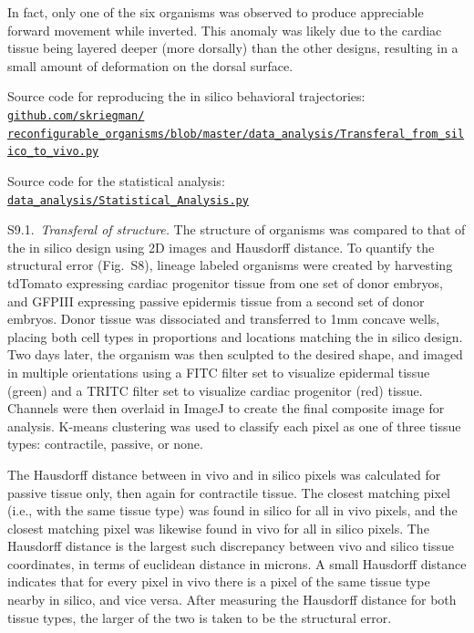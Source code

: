 In fact, only one of the six organisms was observed to produce appreciable forward movement while inverted. 
This anomaly was likely due to the cardiac tissue being layered deeper (more dorsally) than the other designs, resulting in a small amount of deformation on the dorsal surface. 


Source code for reproducing the in silico behavioral trajectories:
\href{https://github.com/skriegman/reconfigurable_organisms/blob/master/data_analysis/Transferal_from_silico_to_vivo.py}{\scriptsize\tt\color{blue}github.com/skriegman/ \\ reconfigurable\_organisms/blob/master/data\_analysis/Transferal\_from\_silico\_to\_vivo.py}

Source code for the statistical analysis:
\href{https://github.com/skriegman/reconfigurable_organisms/blob/master/data_analysis/Statistical_Analysis.py}{\scriptsize\tt\color{blue}data\_analysis/Statistical\_Analysis.py}

\vspace{1em}

S9.1.~\textit{Transferal of structure.}
The structure of organisms was compared to that of the in silico design using 2D images and Hausdorff distance. 
To quantify the structural error (Fig.~S8), lineage labeled organisms were created by harvesting tdTomato expressing cardiac progenitor tissue from one set of donor embryos, and GFPIII expressing passive epidermis tissue from a second set of donor embryos. 
Donor tissue was dissociated and transferred to 1mm concave wells, placing both cell types in proportions and locations matching the in silico design. 
Two days later, the organism was then sculpted to the desired shape, and imaged in multiple orientations using a FITC filter set to visualize epidermal tissue (green) and a TRITC filter set to visualize cardiac progenitor (red) tissue. 
Channels were then overlaid in ImageJ to create the final composite image for analysis. 
K-means clustering was used to classify each pixel as one of three tissue types: contractile, passive, or none. 

The Hausdorff distance between in vivo and in silico pixels was calculated for passive tissue only, then again for contractile tissue. 
The closest matching pixel (i.e., with the same tissue type) was found in silico for all in vivo pixels, and the closest matching pixel was likewise found in vivo for all in silico pixels. 
The Hausdorff distance is the largest such discrepancy between vivo and silico tissue coordinates, in terms of euclidean distance in microns. 
A small Hausdorff distance indicates that for every pixel in vivo there is a pixel of the same tissue type nearby in silico, and vice versa. 
After measuring the Hausdorff distance for both tissue types, the larger of the two is taken to be the structural error. 

